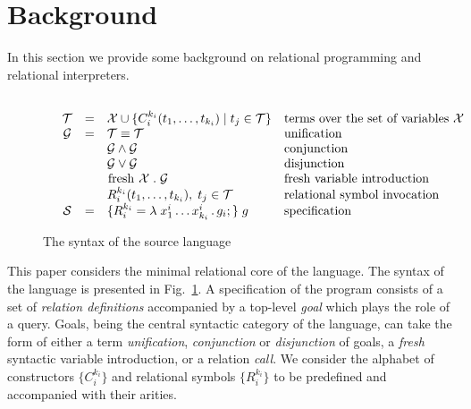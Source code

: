 \section{Background}
\label{background}

In this section we provide some background on relational programming and relational interpreters.

\subsection{\mk}
\label{mkIntro}

\begin{figure*}[t]
  \[
  \begin{array}{cccll}
    &\mathcal{T} & = & \mathcal{X} \cup \{C_i^{k_i} (t_1, \dots, t_{k_i}) \mid t_j\in\mathcal{T}\} & \mbox{terms over the set of variables $\mathcal{X}$} \\
    &\mathcal{G} & = & \mathcal{T}\equiv\mathcal{T}   &  \mbox{unification} \\
    &            &   & \mathcal{G}\wedge\mathcal{G}     & \mbox{conjunction} \\
    &            &   & \mathcal{G}\vee\mathcal{G}       &\mbox{disjunction} \\
    &            &   & \mbox{\lstinline|fresh|}\;\mathcal{X}\;.\;\mathcal{G} & \mbox{fresh variable introduction} \\
    &            &   & R_i^{k_i} (t_1,\dots,t_{k_i}),\;t_j\in\mathcal{T} & \mbox{relational symbol invocation} \\
    &\mathcal{S} & = & \{R_i^{k_i} = \lambda\;x_1^i\dots x_{k_i}^i\,.\, g_i;\}\; g & \mbox{specification}
  \end{array}
  \]
  \caption{The syntax of the source language}
  \label{syntax}
  \end{figure*}



This paper considers the minimal relational core of the \mk language.
The syntax of the language is presented in Fig.~\ref{syntax}.
A specification of the \mk program consists of a set of \emph{relation definitions} accompanied by a top-level \emph{goal} which plays the role of a query.
Goals, being the central syntactic category of the language, can take the form of either a term \emph{unification}, \emph{conjunction} or \emph{disjunction} of goals, a \emph{fresh} syntactic variable introduction, or a relation \emph{call}.
We consider the alphabet of constructors $\{C^{k_i}_i\}$ and relational symbols $\{R^{k_i}_i\}$ to be predefined and accompanied with their arities.

